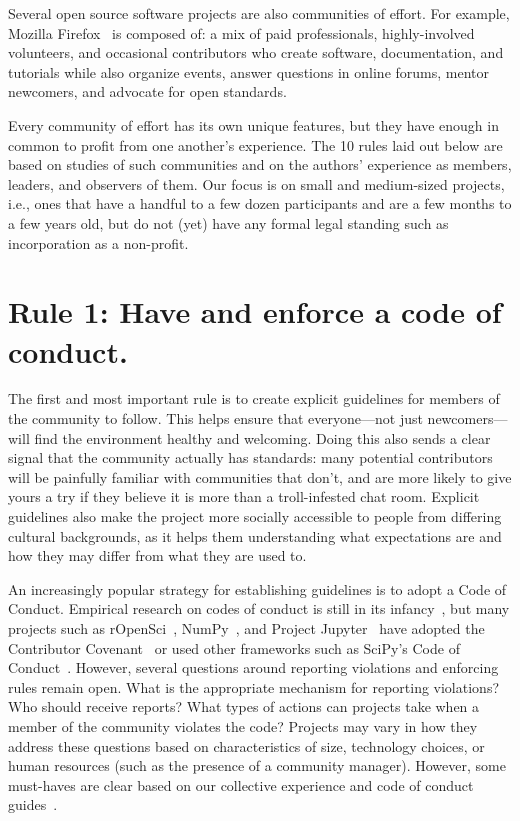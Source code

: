 \documentclass[10pt,letterpaper]{article}
\newcommand{\rulemajor}[1]{\section*{#1}}
\begin{document}
Several open source software projects are also communities of effort.
For example, Mozilla Firefox~\cite{mozilla} is composed of:
a mix of paid professionals,
highly-involved volunteers,
and occasional contributors who create software,
documentation,
and tutorials
while also organize events,
answer questions in online forums,
mentor newcomers,
and advocate for open standards.

Every community of effort has its own unique features,
but they have enough in common to profit from one another's experience.
The 10 rules laid out below are based on studies of such communities
and on the authors' experience as members,
leaders, and observers of them.
Our focus is on small and medium-sized projects,
i.e., ones that have a handful to a few dozen participants
and are a few months to a few years old,
but do not (yet) have any formal legal standing
such as incorporation as a non-profit.

\rulemajor{Rule 1: Have and enforce a code of conduct.}

The first and most important rule is
to create explicit guidelines for members of the community to follow.
This helps ensure that everyone---not just newcomers---will find the environment healthy and welcoming.
Doing this also sends a clear signal that the community actually has standards:
many potential contributors will be painfully familiar with communities that don't,
and are more likely to give yours a try if they believe
it is more than a troll-infested chat room.
Explicit guidelines also make the project more socially accessible to people from differing cultural backgrounds,
as it helps them understanding what expectations are and how they may differ from what they are used to.

An increasingly popular strategy for establishing guidelines is to adopt a Code of Conduct.
Empirical research on codes of conduct is still in its infancy~\cite{tourani2017},
but many projects such as rOpenSci~\cite{ropensci-coc},
NumPy~\cite{numpy-coc},
and Project Jupyter~\cite{jupyter-coc}
have adopted the Contributor Covenant~\cite{covenant}
or used other frameworks such as SciPy's Code of Conduct~\cite{scipy-coc}.
However, several questions around reporting violations and enforcing rules remain open.
What is the appropriate mechanism for reporting violations?
Who should receive reports?
What types of actions can projects take when a member of the community violates the code?
Projects may vary in how they address these questions based on characteristics of size, technology choices, or human resources
(such as the presence of a community manager).
However, some must-haves are clear based on our collective experience and code of conduct guides~\cite{aurora2019}.
\end{document}
